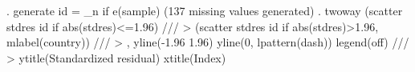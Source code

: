 . generate id = _n if e(sample)
(137 missing values generated)
{\smallskip}
. twoway (scatter stdres id if abs(stdres)<=1.96) ///
>        (scatter stdres id if abs(stdres)>1.96, mlabel(country)) ///
>        , yline(-1.96 1.96) yline(0, lpattern(dash)) legend(off) ///
>          ytitle(Standardized residual) xtitle(Index)
{\smallskip}

